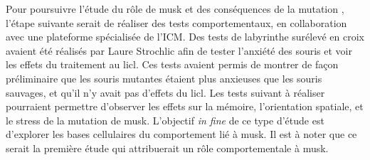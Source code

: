 Pour poursuivre l'étude du rôle de \gls{musk} et des conséquences de la mutation \mcrd, l'étape suivante serait de réaliser des tests comportementaux, en collaboration avec une plateforme spécialisée de l'ICM. Des tests de labyrinthe surélevé en croix avaient été réalisés par Laure Strochlic  afin de tester l'anxiété des souris \mcrd et voir les effets du traitement au \gls{licl}. Ces tests avaient permis de montrer de façon préliminaire que les souris mutantes étaient plus anxieuses que les souris sauvages, et qu'il n'y avait pas d'effets du \gls{licl}. Les tests suivant à réaliser pourraient permettre d'observer les effets sur la mémoire, l'orientation spatiale, et le stress de la mutation de \gls{musk}. L'objectif \emph{in fine} de ce type d'étude est d'explorer les bases cellulaires du comportement lié à \gls{musk}. Il est à noter que ce serait la première étude qui attribuerait un rôle comportementale à \gls{musk}.